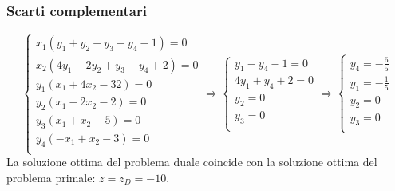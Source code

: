 \documentclass[\main/main.tex]{subfiles}
\begin{document}
\subsubsection*{Scarti complementari}
\[
  \begin{cases}
    x_1(y_1 + y_2 + y_3 -y_4  - 1 )=0 \\
    x_2(4y_1 -2y_2 + y_3 +y_4 + 2)=0  \\
    y_1(x_1 + 4x_2 -32)=0             \\
    y_2(x_1 - 2x_2 -2 )=0             \\
    y_3(x_1 + x_2  -5 )=0             \\
    y_4(-x_1 + x_2 -3 )=0             \\
  \end{cases}
  \Rightarrow
  \begin{cases}
    y_1  -y_4  - 1=0 \\
    4y_1 +y_4 + 2=0  \\
    y_2=0            \\
    y_3=0            \\
  \end{cases}
  \Rightarrow
  \begin{cases}
    y_4=-\frac{6}{5} \\
    y_1=-\frac{1}{5} \\
    y_2=0            \\
    y_3=0            \\
  \end{cases}
\]
La soluzione ottima del problema duale coincide con la soluzione ottima del problema primale: $z = z_D = -10$.
\end{document}
